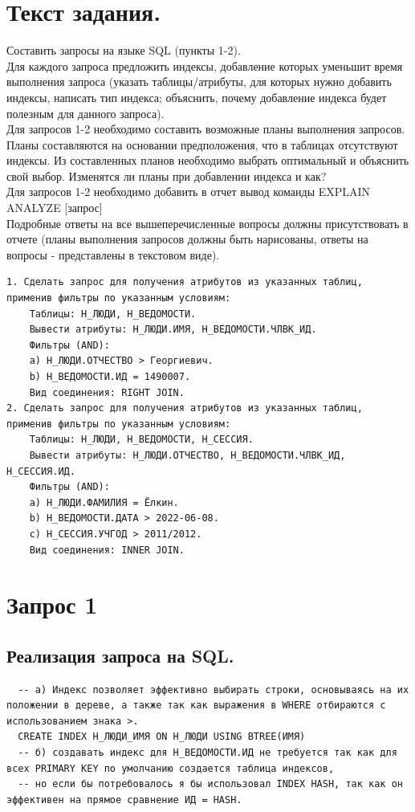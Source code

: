 \documentclass[12pt,onecolumn]{article}
\begin{document}
\section{Текст задания.}
Составить запросы на языке SQL (пункты 1-2).\\
Для каждого запроса предложить индексы, добавление которых уменьшит время выполнения запроса (указать таблицы/атрибуты, для которых нужно добавить индексы, написать тип индекса; объяснить, почему добавление индекса будет полезным для данного запроса).\\
Для запросов 1-2 необходимо составить возможные планы выполнения запросов. Планы составляются на основании предположения, что в таблицах отсутствуют индексы. Из составленных планов необходимо выбрать оптимальный и объяснить свой выбор.
Изменятся ли планы при добавлении индекса и как?\\
Для запросов 1-2 необходимо добавить в отчет вывод команды EXPLAIN ANALYZE [запрос]\\
Подробные ответы на все вышеперечисленные вопросы должны присутствовать в отчете (планы выполнения запросов должны быть нарисованы, ответы на вопросы - представлены в текстовом виде).\\
\begin{verbatim}
1. Сделать запрос для получения атрибутов из указанных таблиц, применив фильтры по указанным условиям:
    Таблицы: Н_ЛЮДИ, Н_ВЕДОМОСТИ.
    Вывести атрибуты: Н_ЛЮДИ.ИМЯ, Н_ВЕДОМОСТИ.ЧЛВК_ИД.
    Фильтры (AND):
    a) Н_ЛЮДИ.ОТЧЕСТВО > Георгиевич.
    b) Н_ВЕДОМОСТИ.ИД = 1490007.
    Вид соединения: RIGHT JOIN.
2. Сделать запрос для получения атрибутов из указанных таблиц, применив фильтры по указанным условиям:
    Таблицы: Н_ЛЮДИ, Н_ВЕДОМОСТИ, Н_СЕССИЯ.
    Вывести атрибуты: Н_ЛЮДИ.ОТЧЕСТВО, Н_ВЕДОМОСТИ.ЧЛВК_ИД, Н_СЕССИЯ.ИД.
    Фильтры (AND):
    a) Н_ЛЮДИ.ФАМИЛИЯ = Ёлкин.
    b) Н_ВЕДОМОСТИ.ДАТА > 2022-06-08.
    c) Н_СЕССИЯ.УЧГОД > 2011/2012.
    Вид соединения: INNER JOIN.
\end{verbatim}
\section{Запрос 1}
\subsection{Реализация запроса на SQL.}

\begin{lstlisting}
  -- a) Индекс позволяет эффективно выбирать строки, основываясь на их положении в дереве, а также так как выражения в WHERE отбираются с использованием знака >.
  CREATE INDEX Н_ЛЮДИ_ИМЯ ON Н_ЛЮДИ USING BTREE(ИМЯ)
  -- б) создавать индекс для Н_ВЕДОМОСТИ.ИД не требуется так как для всех PRIMARY KEY по умолчанию создается таблица индексов,
  -- но если бы потребовалось я бы использовал INDEX HASH, так как он эффективен на прямое сравнение ИД = HASH.
\end{lstlisting}
\end{document}
